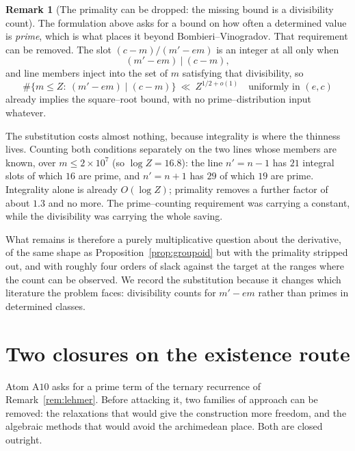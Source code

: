 \documentclass[11pt]{article}
\theoremstyle{definition}
\newtheorem{remark}[theorem]{Remark}
\begin{document}
\begin{remark}[The primality can be dropped: the missing bound is a divisibility count]\label{rem:integrality}
The formulation above asks for a bound on how often a determined value is \emph{prime}, which is
what places it beyond Bombieri--Vinogradov. That requirement can be removed. The slot
$(c-m)/(m'-em)$ is an integer at all only when
\[ (m'-em)\ \big|\ (c-m), \]
and line members inject into the set of $m$ satisfying that divisibility, so
\[ \#\{m\le Z:\ (m'-em)\mid(c-m)\}\ \ll\ Z^{1/2+o(1)}\quad\text{uniformly in }(e,c) \]
already implies the square--root bound, with no prime--distribution input whatever.

The substitution costs almost nothing, because integrality is where the thinness lives.
Counting both conditions separately on the two lines whose members are known, over $m\le2\times10^7$
(so $\log Z=16.8$): the line $n'=n-1$ has $21$ integral slots of which $16$ are prime, and
$n'=n+1$ has $29$ of which $19$ are prime. Integrality alone is already $O(\log Z)$; primality
removes a further factor of about $1.3$ and no more. The prime--counting requirement was carrying
a constant, while the divisibility was carrying the whole saving.

What remains is therefore a purely multiplicative question about the derivative, of the same shape
as Proposition~\ref{prop:groupoid} but with the primality stripped out, and with roughly four orders
of slack against the target at the ranges where the count can be observed. We record the
substitution because it changes which literature the problem faces: divisibility counts for
$m'-em$ rather than primes in determined classes.
\end{remark}

\section{Two closures on the existence route}\label{sec:exclosure}

Atom $\mathrm{A}10$ asks for a prime term of the ternary recurrence of
Remark~\textup{\ref{rem:lehmer}}. Before attacking it, two families of approach can be removed:
the relaxations that would give the construction more freedom, and the algebraic methods that
would avoid the archimedean place. Both are closed outright.
\end{document}
